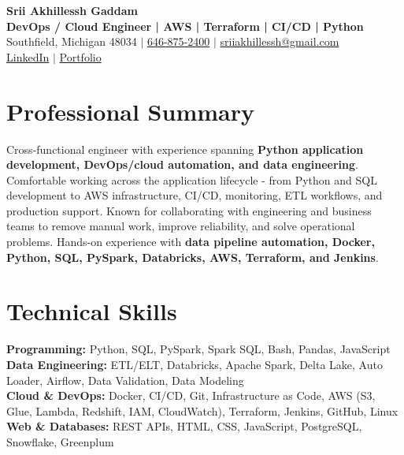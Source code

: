 \documentclass[letterpaper,10pt]{article}
\begin{document}
\fontsize{9.35pt}{10.45pt}\selectfont

\begin{center}
    {\LARGE \textbf{Srii Akhillessh Gaddam}} \\[-1pt]
    \textbf{DevOps / Cloud Engineer | AWS | Terraform | CI/CD | Python} \\[2pt]
    Southfield, Michigan 48034 $|$
    \href{tel:6468752400}{646-875-2400} $|$
    \href{mailto:sriiakhillessh@gmail.com}{sriiakhillessh@gmail.com} \\[1pt]
    \href{https://www.linkedin.com/in/srii-akhiilessh-gaddam-b48668191/}{LinkedIn} $|$
    \href{https://sriiakhillesshg.github.io/portfolio/}{Portfolio}
\end{center}
\vspace{-8pt}

\section{Professional Summary}
\small{Cross-functional engineer with experience spanning \textbf{Python application development, DevOps/cloud automation, and data engineering}. Comfortable working across the application lifecycle - from Python and SQL development to AWS infrastructure, CI/CD, monitoring, ETL workflows, and production support. Known for collaborating with engineering and business teams to remove manual work, improve reliability, and solve operational problems. Hands-on experience with \textbf{data pipeline automation, Docker, Python, SQL, PySpark, Databricks, AWS, Terraform, and Jenkins}.}

\section{Technical Skills}
\small{
\textbf{Programming:} Python, SQL, PySpark, Spark SQL, Bash, Pandas, JavaScript \\
\textbf{Data Engineering:} ETL/ELT, Databricks, Apache Spark, Delta Lake, Auto Loader, Airflow, Data Validation, Data Modeling \\
\textbf{Cloud \& DevOps:} Docker, CI/CD, Git, Infrastructure as Code, AWS (S3, Glue, Lambda, Redshift, IAM, CloudWatch), Terraform, Jenkins, GitHub, Linux \\
\textbf{Web \& Databases:} REST APIs, HTML, CSS, JavaScript, PostgreSQL, Snowflake, Greenplum
}
\end{document}
